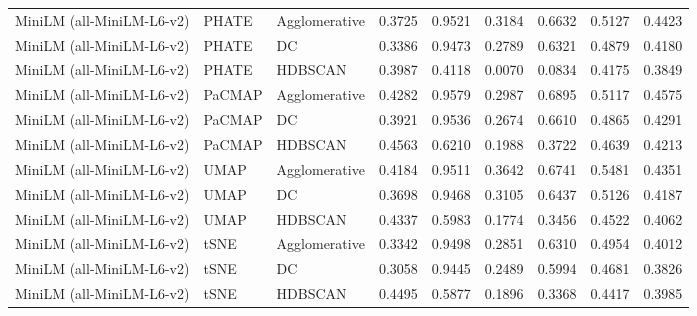 \begin{table}[t]
\begin{tabular}{lllcccccc}
MiniLM (all-MiniLM-L6-v2) & PHATE & Agglomerative & 0.3725 & 0.9521 & 0.3184 & 0.6632 & 0.5127 & 0.4423 \\
MiniLM (all-MiniLM-L6-v2) & PHATE & DC & 0.3386 & 0.9473 & 0.2789 & 0.6321 & 0.4879 & 0.4180 \\
MiniLM (all-MiniLM-L6-v2) & PHATE & HDBSCAN & 0.3987 & 0.4118 & 0.0070 & 0.0834 & 0.4175 & 0.3849 \\

MiniLM (all-MiniLM-L6-v2) & PaCMAP & Agglomerative & 0.4282 & 0.9579 & 0.2987 & 0.6895 & 0.5117 & 0.4575 \\
MiniLM (all-MiniLM-L6-v2) & PaCMAP & DC & 0.3921 & 0.9536 & 0.2674 & 0.6610 & 0.4865 & 0.4291 \\
MiniLM (all-MiniLM-L6-v2) & PaCMAP & HDBSCAN & 0.4563 & 0.6210 & 0.1988 & 0.3722 & 0.4639 & 0.4213 \\

MiniLM (all-MiniLM-L6-v2) & UMAP & Agglomerative & 0.4184 & 0.9511 & 0.3642 & 0.6741 & 0.5481 & 0.4351 \\
MiniLM (all-MiniLM-L6-v2) & UMAP & DC & 0.3698 & 0.9468 & 0.3105 & 0.6437 & 0.5126 & 0.4187 \\
MiniLM (all-MiniLM-L6-v2) & UMAP & HDBSCAN & 0.4337 & 0.5983 & 0.1774 & 0.3456 & 0.4522 & 0.4062 \\

MiniLM (all-MiniLM-L6-v2) & tSNE & Agglomerative & 0.3342 & 0.9498 & 0.2851 & 0.6310 & 0.4954 & 0.4012 \\
MiniLM (all-MiniLM-L6-v2) & tSNE & DC & 0.3058 & 0.9445 & 0.2489 & 0.5994 & 0.4681 & 0.3826 \\
MiniLM (all-MiniLM-L6-v2) & tSNE & HDBSCAN & 0.4495 & 0.5877 & 0.1896 & 0.3368 & 0.4417 & 0.3985 \\

\bottomrule
\end{tabular}
\end{table}
% 